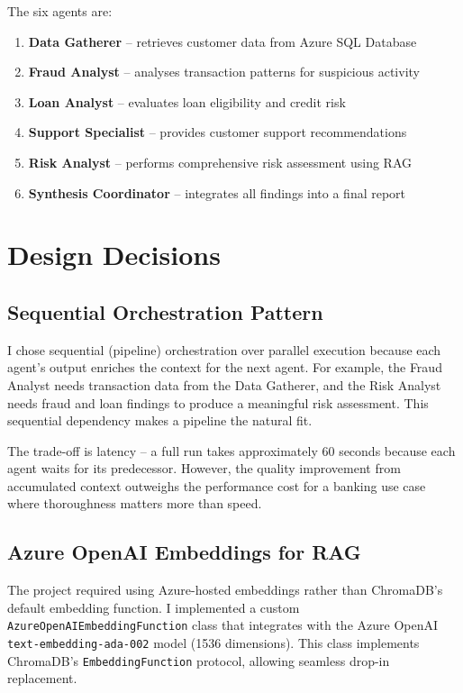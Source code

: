 \documentclass[12pt,a4paper]{article}
\begin{document}
The six agents are:
\begin{enumerate}
    \item \textbf{Data Gatherer} -- retrieves customer data from Azure SQL Database
    \item \textbf{Fraud Analyst} -- analyses transaction patterns for suspicious activity
    \item \textbf{Loan Analyst} -- evaluates loan eligibility and credit risk
    \item \textbf{Support Specialist} -- provides customer support recommendations
    \item \textbf{Risk Analyst} -- performs comprehensive risk assessment using RAG
    \item \textbf{Synthesis Coordinator} -- integrates all findings into a final report
\end{enumerate}

\section{Design Decisions}

\subsection{Sequential Orchestration Pattern}

I chose sequential (pipeline) orchestration over parallel execution because
each agent's output enriches the context for the next agent. For example,
the Fraud Analyst needs transaction data from the Data Gatherer, and the
Risk Analyst needs fraud and loan findings to produce a meaningful risk
assessment. This sequential dependency makes a pipeline the natural fit.

The trade-off is latency -- a full run takes approximately 60 seconds because
each agent waits for its predecessor. However, the quality improvement from
accumulated context outweighs the performance cost for a banking use case
where thoroughness matters more than speed.

\subsection{Azure OpenAI Embeddings for RAG}

The project required using Azure-hosted embeddings rather than ChromaDB's
default embedding function. I implemented a custom
\texttt{AzureOpenAIEmbeddingFunction} class that integrates with the Azure OpenAI
\texttt{text-embedding-ada-002} model (1536 dimensions). This class implements
ChromaDB's \texttt{EmbeddingFunction} protocol, allowing seamless drop-in replacement.
\end{document}
